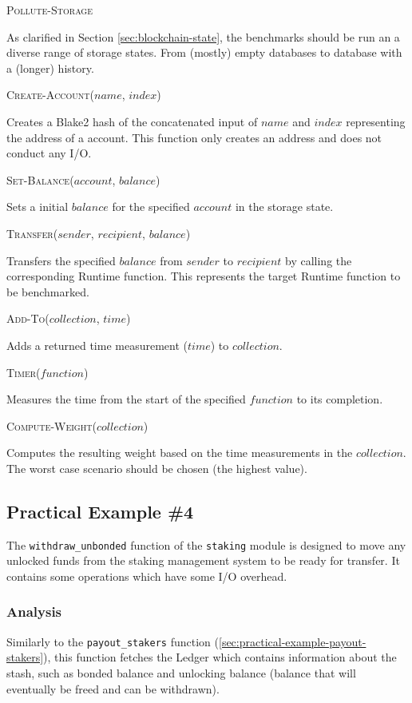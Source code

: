 \documentclass[11pt,a4paper]{article}
\newcommand{\SubItem}[1]{
    {\setlength\itemindent{15pt} \item[-] #1}
}
\begin{document}
\begin{itemize}
  \item \textsc{Pollute-Storage} \SubItem{As clarified in Section
  \ref{sec:blockchain-state}, the benchmarks should be run an a diverse range of
  storage states. From (mostly) empty databases to database with a (longer)
  history.}
  \item \textsc{Create-Account($name$, $index$)} \SubItem{Creates a Blake2 hash
      of the concatenated input of $name$ and $index$ representing the address
      of a account. This function only creates an address and does not conduct
      any I/O.}
  \item \textsc{Set-Balance($account$, $balance$)} \SubItem{Sets a initial
      $balance$ for the specified $account$ in the storage state.}
  \item \textsc{Transfer($sender$, $recipient$, $balance$)} \SubItem{Transfers
      the specified $balance$ from $sender$ to $recipient$ by calling the
      corresponding Runtime function. This represents the target Runtime
      function to be benchmarked.}
  \item \textsc{Add-To($collection$, $time$)} \SubItem{Adds a returned time
      measurement ($time$) to $collection$.}
  \item \textsc{Timer($function$)} \SubItem{Measures the time from the start of
      the specified $function$ to its completion.}
  \item \textsc{Compute-Weight($collection$)}
  \SubItem{Computes the resulting weight based on the time measurements in the
  $collection$. The worst case scenario should be chosen (the highest value).}
\end{itemize}

\subsection{Practical Example \#4}

The \verb|withdraw_unbonded| function of the \verb|staking| module is designed to
move any unlocked funds from the staking management system to be ready for
transfer. It contains some operations which have some I/O overhead.

\subsubsection{Analysis}

Similarly to the \verb|payout_stakers| function
(\ref{sec:practical-example-payout-stakers}), this function fetches the Ledger
which contains information about the stash, such as bonded balance and unlocking
balance (balance that will eventually be freed and can be withdrawn).
\end{document}
